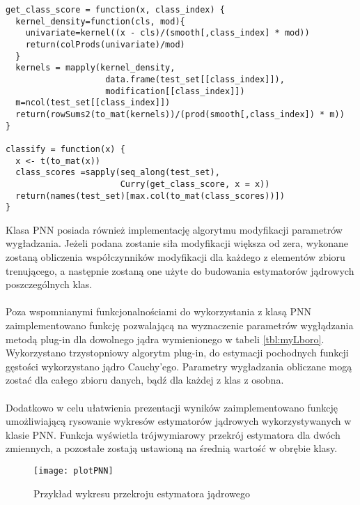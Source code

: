 \documentclass[a4paper,12pt,twoside]{article}
\begin{document}
\newpage
\begin{lstlisting}[caption={Kod funkcji classify i get\_class\_score}]
get_class_score = function(x, class_index) {
  kernel_density=function(cls, mod){
    univariate=kernel((x - cls)/(smooth[,class_index] * mod))
    return(colProds(univariate)/mod)
  }
  kernels = mapply(kernel_density,
                    data.frame(test_set[[class_index]]),
                    modification[[class_index]])
  m=ncol(test_set[[class_index]])
  return(rowSums2(to_mat(kernels))/(prod(smooth[,class_index]) * m))
}

classify = function(x) {
  x <- t(to_mat(x))
  class_scores =sapply(seq_along(test_set),
                       Curry(get_class_score, x = x))
  return(names(test_set)[max.col(to_mat(class_scores))])
}
\end{lstlisting}
Klasa PNN posiada również implementację algorytmu modyfikacji parametrów wygładzania. Jeżeli podana zostanie siła modyfikacji większa od zera, wykonane zostaną obliczenia współczynników modyfikacji dla każdego z elementów zbioru trenującego, a następnie zostaną one użyte do budowania estymatorów jądrowych poszczególnych klas.
\paragraph{}
Poza wspomnianymi funkcjonalnościami do wykorzystania z klasą PNN zaimplementowano funkcję pozwalającą na wyznaczenie parametrów wygłądzania metodą plug-in dla dowolnego jądra wymienionego w tabeli \ref{tbl:myLboro}. Wykorzystano trzystopniowy algorytm plug-in, do estymacji pochodnych funkcji gęstości wykorzystano jądro Cauchy'ego. Parametry wygładzania obliczane mogą zostać dla całego zbioru danych, bądź dla każdej z klas z osobna. 
\paragraph{}
\newpage
Dodatkowo w celu ułatwienia prezentacji wyników zaimplementowano funkcję umożliwiającą rysowanie wykresów estymatorów jądrowych wykorzystywanych w klasie PNN. Funkcja wyświetla trójwymiarowy przekrój estymatora dla dwóch zmiennych, a pozostałe zostają ustawioną na średnią wartość w obrębie klasy.
\begin{figure}[h]
    \centering
    \texttt{[image: plotPNN]}
    \caption{Przykład wykresu przekroju estymatora jądrowego}
\end{figure}
\newpage
\end{document}
